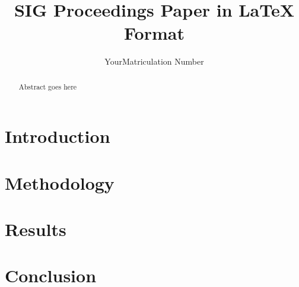 \documentclass[sigconf]{acmart}
\begin{document}
\title{SIG Proceedings Paper in LaTeX Format}

\author{YourMatriculation Number}



\begin{abstract}
Abstract goes here
\end{abstract}





\maketitle

\section{Introduction}
\section{Methodology}
\section{Results}
\section{Conclusion}

%
 
\end{document}
